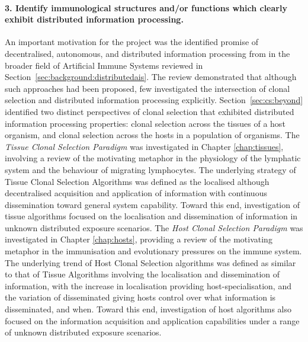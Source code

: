 \paragraph{3. Identify immunological structures and/or functions which clearly exhibit distributed information processing.}
An important motivation for the project was the identified promise of decentralised, autonomous, and distributed information processing from in the broader field of Artificial Immune Systems reviewed in Section~\ref{sec:background:distributedais}. The review demonstrated that although such approaches had been proposed, few investigated the intersection of clonal selection and distributed information processing explicitly.
Section~\ref{sec:cs:beyond} identified two distinct perspectives of clonal selection that exhibited distributed information processing properties: clonal selection across the tissues of a host organism, and clonal selection across the hosts in a population of organisms.
The \emph{Tissue Clonal Selection Paradigm} was investigated in Chapter \ref{chap:tissues}, involving a review of the motivating metaphor in the physiology of the lymphatic system and the behaviour of migrating lymphocytes. The underlying strategy of Tissue Clonal Selection Algorithms was defined as the localised although decentralised acquisition and application of information with continuous dissemination toward general system capability. Toward this end, investigation of tissue algorithms focused on the localisation and dissemination of information in unknown distributed exposure scenarios.
The \emph{Host Clonal Selection Paradigm} was investigated in Chapter \ref{chap:hosts}, providing a review of the motivating metaphor in the immunisation and evolutionary pressures on the immune system. The underlying trend of Host Clonal Selection algorithms was defined as similar to that of Tissue Algorithms involving the localisation and dissemination of information, with the increase in localisation providing host-specialisation, and the variation of disseminated giving hosts control over what information is disseminated, and when. Toward this end, investigation of host algorithms also focused on the information acquisition and application capabilities under a range of unknown distributed exposure scenarios.

